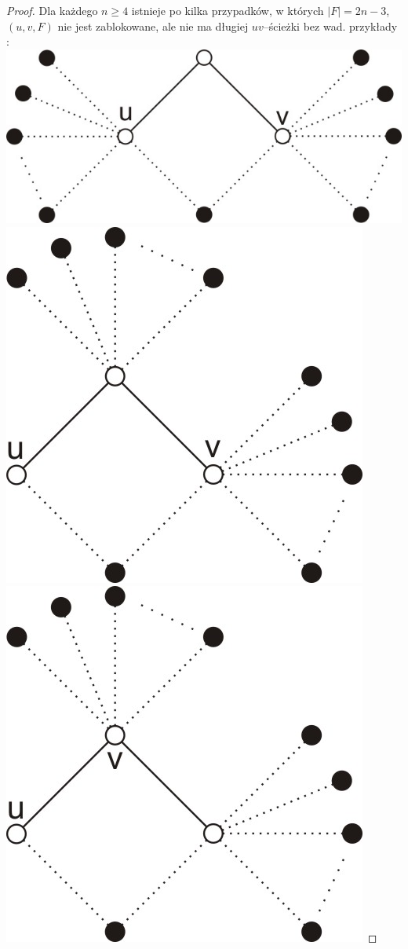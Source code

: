 \documentclass{pracamgr}
\begin{document}
   \begin{proof}
   Dla każdego $n\ge 4$ istnieje po kilka przypadków, w których $|F|=2n-3$, $(u,v,F)$ nie jest zablokowane, ale nie ma długiej $uv$--ścieżki bez wad. przykłady :\newline
   \includegraphics{img/Q_niezablokowane_1.jpg}\quad\quad\quad
   \includegraphics{img/Q_niezablokowane_2.jpg}\quad\quad\quad
   \includegraphics{img/Q_niezablokowane_3.jpg}
   \end{proof}
\end{document}
